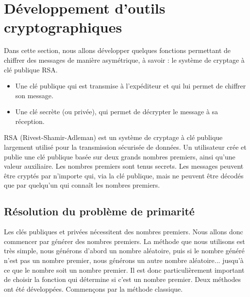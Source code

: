 \documentclass{article}
\begin{document}
\section{Développement d’outils cryptographiques}
Dans cette section, nous allons développer quelques fonctions permettant de chiffrer des messages de manière asymétrique, à savoir : le système de cryptage à clé publique RSA.
\begin{itemize}
\item Une clé publique qui est transmise à l'expéditeur et qui lui permet de chiffrer son message.
\item Une clé secrète (ou privée), qui permet de décrypter le message à sa réception.
\end{itemize}
RSA (Rivest-Shamir-Adleman) est un système de cryptage à clé publique largement utilisé pour la transmission sécurisée de données.
Un utilisateur crée et publie une clé publique basée sur deux grands nombres premiers, ainsi qu'une valeur auxiliaire. 
Les nombres premiers sont tenus secrets. Les messages peuvent être cryptés par n'importe qui, via la clé publique, mais ne peuvent être décodés que par quelqu'un qui connaît les nombres premiers.
\subsection{Résolution du problème de primarité}
Les clés publiques et privées nécessitent des nombres premiers. Nous allons donc commencer par générer des nombres premiers. 
La méthode que nous utilisons est très simple, nous générons d'abord un nombre aléatoire, puis si le nombre généré n'est pas un nombre premier, nous générons un autre nombre aléatoire... jusqu'à ce que le nombre soit un nombre premier.
Il est donc particulièrement important de choisir la fonction qui détermine si c'est un nombre premier. Deux méthodes ont été développées. Commençons par la méthode classique.
\end{document}
